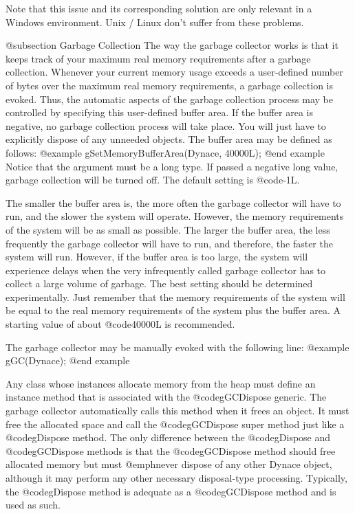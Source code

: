 Note that this issue and its corresponding solution are only relevant
in a Windows environment.  Unix / Linux don't suffer from these problems.

@subsection Garbage Collection
The way the garbage collector works is that it keeps track of your
maximum real memory requirements after a garbage collection.  Whenever
your current memory usage exceeds a user-defined number of bytes over
the maximum real memory requirements, a garbage collection is evoked.
Thus, the automatic aspects of the garbage collection process may be
controlled by specifying this user-defined buffer area.  If the buffer
area is negative, no garbage collection process will take place.  You
will just have to explicitly dispose of any unneeded objects.  The
buffer area may be defined as follows:
@example
        gSetMemoryBufferArea(Dynace, 40000L);
@end example
Notice that the argument must be a long type.  If passed a negative long value,
garbage collection will be turned off.  The default setting is @code{-1L}.

The smaller the buffer area is, the more often the garbage collector will
have to run, and the slower the system will operate.  However, the memory
requirements of the system will be as small as possible.  The larger the
buffer area, the less frequently the garbage collector will have to run, and
therefore, the faster the system will run.  However, if the buffer area is
too large, the system will experience delays when the very infrequently
called garbage collector has to collect a large volume of garbage.  The
best setting should be determined experimentally.  Just remember that
the memory requirements of the system will be equal to the real memory
requirements of the system plus the buffer area.  A starting value
of about @code{40000L} is recommended.

The garbage collector may be manually evoked with the following line:
@example
        gGC(Dynace);
@end example

Any class whose instances allocate memory from the heap must define an
instance method that is associated with the @code{gGCDispose} generic.
The garbage collector automatically calls this method when it frees an
object.  It must free the allocated space and call the @code{gGCDispose}
super method just like a @code{gDispose} method.  The only difference
between the @code{gDispose} and @code{gGCDispose} methods is that the
@code{gGCDispose} method should free allocated memory but must
@emph{never} dispose of any other Dynace object, although it may perform
any other necessary disposal-type processing.  Typically, the
@code{gDispose} method is adequate as a @code{gGCDispose} method and is
used as such.

